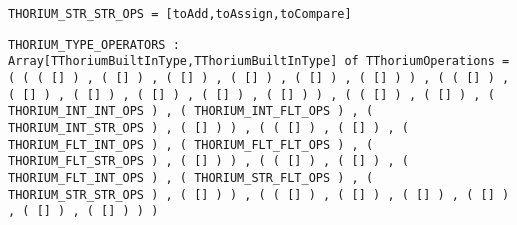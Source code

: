 \begin{verbatim}
THORIUM_STR_STR_OPS = [toAdd,toAssign,toCompare]
\end{verbatim}
\label{thoriumcore:thorium:thoriumstrstrops}



\begin{verbatim}
THORIUM_TYPE_OPERATORS : Array[TThoriumBuiltInType,TThoriumBuiltInType] of TThoriumOperations = ( ( ( [] ) , ( [] ) , ( [] ) , ( [] ) , ( [] ) , ( [] ) ) , ( ( [] ) , ( [] ) , ( [] ) , ( [] ) , ( [] ) , ( [] ) ) , ( ( [] ) , ( [] ) , ( THORIUM_INT_INT_OPS ) , ( THORIUM_INT_FLT_OPS ) , ( THORIUM_INT_STR_OPS ) , ( [] ) ) , ( ( [] ) , ( [] ) , ( THORIUM_FLT_INT_OPS ) , ( THORIUM_FLT_FLT_OPS ) , ( THORIUM_FLT_STR_OPS ) , ( [] ) ) , ( ( [] ) , ( [] ) , ( THORIUM_FLT_INT_OPS ) , ( THORIUM_STR_FLT_OPS ) , ( THORIUM_STR_STR_OPS ) , ( [] ) ) , ( ( [] ) , ( [] ) , ( [] ) , ( [] ) , ( [] ) , ( [] ) ) )
\end{verbatim}
\label{thoriumcore:thorium:thoriumtypeoperators}



